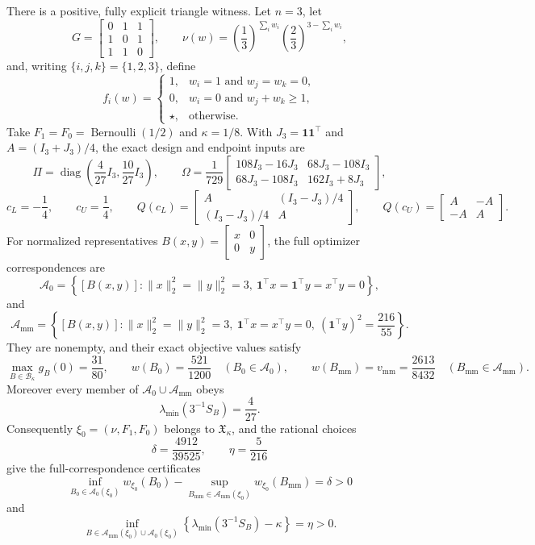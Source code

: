 There is a positive, fully explicit triangle witness.  Let \(n=3\), let
\[
G=\begin{bmatrix}0&1&1\\1&0&1\\1&1&0\end{bmatrix},
\qquad
\nu(w)=\left(\frac13\right)^{\sum_iw_i}
       \left(\frac23\right)^{3-\sum_iw_i},
\]
and, writing \(\{i,j,k\}=\{1,2,3\}\), define
\[
f_i(w)=
\begin{cases}
1,&w_i=1\text{ and }w_j=w_k=0,\\
0,&w_i=0\text{ and }w_j+w_k\ge1,\\
\star,&\text{otherwise}.
\end{cases}
\]
Take \(F_1=F_0=\operatorname{Bernoulli}(1/2)\) and \(\kappa=1/8\).  With \(J_3=\mathbf 1\mathbf 1^{\top}\) and \(A=(I_3+J_3)/4\), the exact design and endpoint inputs are
\[
\Pi=\operatorname{diag}\!\left(\frac4{27}I_3,\frac{10}{27}I_3\right),
\qquad
\Omega=\frac1{729}
\begin{bmatrix}
108I_3-16J_3&68J_3-108I_3\\
68J_3-108I_3&162I_3+8J_3
\end{bmatrix},
\]
\[
c_L=-\frac14,
\qquad c_U=\frac14,
\qquad
Q(c_L)=
\begin{bmatrix}A&(I_3-J_3)/4\\(I_3-J_3)/4&A\end{bmatrix},
\qquad
Q(c_U)=
\begin{bmatrix}A&-A\\-A&A\end{bmatrix}.
\]
For normalized representatives \(B(x,y)=\begin{bmatrix}x&0\\0&y\end{bmatrix}\), the full optimizer correspondences are
\[
\mathcal A_0=
\left\{[B(x,y)]:
\lVert x\rVert_2^2=\lVert y\rVert_2^2=3,\ 
\mathbf 1^{\top}x=\mathbf 1^{\top}y=x^{\top}y=0
\right\},
\]
and
\[
\mathcal A_{\mathrm{mm}}=
\left\{[B(x,y)]:
\lVert x\rVert_2^2=\lVert y\rVert_2^2=3,\ 
\mathbf 1^{\top}x=x^{\top}y=0,\ 
(\mathbf 1^{\top}y)^2=\frac{216}{55}
\right\}.
\]
They are nonempty, and their exact objective values satisfy
\[
\max_{B\in\mathcal B_\kappa}g_B(0)=\frac{31}{80},
\qquad
w(B_0)=\frac{521}{1200}\quad(B_0\in\mathcal A_0),
\qquad
w(B_{\mathrm{mm}})=v_{\mathrm{mm}}=\frac{2613}{8432}
\quad(B_{\mathrm{mm}}\in\mathcal A_{\mathrm{mm}}).
\]
Moreover every member of \(\mathcal A_0\cup\mathcal A_{\mathrm{mm}}\) obeys
\[
\lambda_{\min}(3^{-1}S_B)=\frac4{27}.
\]
Consequently \(\xi_0=(\nu,F_1,F_0)\) belongs to \(\mathfrak X_\kappa\), and the rational choices
\[
\delta=\frac{4912}{39525},
\qquad
\eta=\frac5{216}
\]
give the full-correspondence certificates
\[
\inf_{B_0\in\mathcal A_0(\xi_0)}w_{\xi_0}(B_0)
-\sup_{B_{\mathrm{mm}}\in\mathcal A_{\mathrm{mm}}(\xi_0)}w_{\xi_0}(B_{\mathrm{mm}})
=\delta>0
\]
and
\[
\inf_{B\in\mathcal A_{\mathrm{mm}}(\xi_0)\cup\mathcal A_0(\xi_0)}
\left\{\lambda_{\min}(3^{-1}S_B)-\kappa\right\}
=\eta>0.
\]